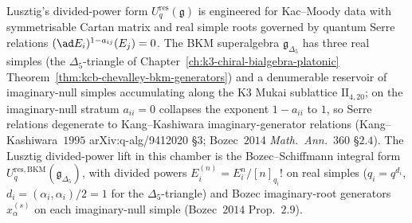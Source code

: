 Lusztig's divided-power form $U^{\mathrm{res}}_q(\mathfrak g)$ is
engineered for Kac--Moody data with symmetrisable Cartan matrix and
real simple roots governed by quantum Serre relations
$(\ad E_i)^{1 - a_{ij}}(E_j) = 0$. The BKM superalgebra
$\mathfrak g_{\Delta_5}$ has three real simples
(the $\Delta_5$-triangle of
Chapter~\ref{ch:k3-chiral-bialgebra-platonic}
Theorem~\ref{thm:kcb-chevalley-bkm-generators}) and a denumerable
reservoir of imaginary-null simples accumulating along the K3 Mukai
sublattice $\mathrm{II}_{4, 20}$; on the imaginary-null stratum
$a_{ii} = 0$ collapses the exponent $1 - a_{ii}$ to $1$, so Serre
relations degenerate to Kang--Kashiwara imaginary-generator relations
(Kang--Kashiwara~$1995$ arXiv:q-alg/9412020 \S$3$; Bozec~$2014$
\emph{Math.~Ann.}~$360$ \S$2.4$). The Lusztig divided-power lift in
this chamber is the Bozec--Schiffmann integral form
$U^{\mathrm{res}, \mathrm{BKM}}_q(\mathfrak g_{\Delta_5})$, with
divided powers $E_i^{(n)} = E_i^n/[n]_{q_i}!$ on real simples
($q_i = q^{d_i}$, $d_i = (\alpha_i, \alpha_i)/2 = 1$ for the
$\Delta_5$-triangle) and Bozec imaginary-root generators
$x_\alpha^{(s)}$ on each imaginary-null simple (Bozec~$2014$
Prop.~$2.9$).

